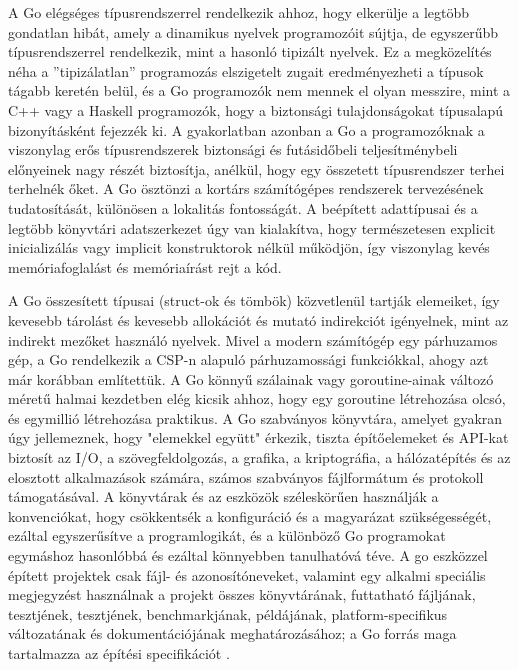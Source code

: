 A Go elégséges típusrendszerrel rendelkezik ahhoz, hogy elkerülje a legtöbb gondatlan hibát, amely a dinamikus nyelvek programozóit sújtja, de egyszerűbb típusrendszerrel rendelkezik, mint a hasonló tipizált nyelvek.
Ez a megközelítés néha a ''tipizálatlan'' programozás elszigetelt zugait eredményezheti a típusok tágabb keretén belül, és a Go programozók nem mennek el olyan messzire, mint a C++ vagy a Haskell programozók, hogy a biztonsági tulajdonságokat típusalapú bizonyításként fejezzék ki.
A gyakorlatban azonban a Go a programozóknak a viszonylag erős típusrendszerek biztonsági és futásidőbeli teljesítménybeli előnyeinek nagy részét biztosítja, anélkül, hogy egy összetett típusrendszer terhei terhelnék őket.
A Go ösztönzi a kortárs számítógépes rendszerek tervezésének tudatosítását, különösen a lokalitás fontosságát.
A beépített adattípusai és a legtöbb könyvtári adatszerkezet úgy van kialakítva, hogy természetesen explicit inicializálás vagy implicit konstruktorok nélkül működjön, így viszonylag kevés memóriafoglalást és memóriaírást rejt a kód.

A Go összesített típusai (struct-ok és tömbök) közvetlenül tartják elemeiket, így kevesebb tárolást és kevesebb allokációt és mutató indirekciót igényelnek, mint az indirekt mezőket használó nyelvek.
Mivel a modern számítógép egy párhuzamos gép, a Go rendelkezik a CSP-n alapuló párhuzamossági funkciókkal, ahogy azt már korábban említettük.
A Go könnyű szálainak vagy goroutine-ainak változó méretű halmai kezdetben elég kicsik ahhoz, hogy egy goroutine létrehozása olcsó, és egymillió létrehozása praktikus.
A Go szabványos könyvtára, amelyet gyakran úgy jellemeznek, hogy "elemekkel együtt" érkezik, tiszta építőelemeket és API-kat biztosít az I/O, a szövegfeldolgozás, a grafika, a kriptográfia, a hálózatépítés és az elosztott alkalmazások számára, számos szabványos fájlformátum és protokoll támogatásával.
A könyvtárak és az eszközök széleskörűen használják a konvenciókat, hogy csökkentsék a konfiguráció és a magyarázat szükségességét, ezáltal egyszerűsítve a programlogikát, és a különböző Go programokat egymáshoz hasonlóbbá és ezáltal könnyebben tanulhatóvá téve.
A go eszközzel épített projektek csak fájl- és azonosítóneveket, valamint egy alkalmi speciális megjegyzést használnak a projekt összes könyvtárának, futtatható fájljának, tesztjének, tesztjének, benchmarkjának, példájának, platform-specifikus változatának és dokumentációjának meghatározásához; a Go forrás maga tartalmazza az építési specifikációt \cite{Alan15}.

